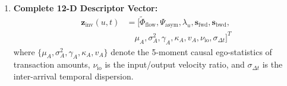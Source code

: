\begin{enumerate}
\begin{align}
    \end{align}
    computed exclusively over causal historical subgraphs ($t_e \le t$). Seed indicator $\mathbf{s}_{\text{seed}}(u, t) = 1.0$ strictly if $u \in \mathcal{V}_{\text{illicit}}^{\text{train}}$ and confirmation timestamp $t_{\text{conf}}(u) \le t - \Delta T_{\text{delay}}$, and $0.0$ otherwise, where $\Delta T_{\text{delay}} \in [30, 90]$\,days models investigative delay. Truncated Power Iteration ($T_{\text{iter}}=3$, tolerance $\epsilon=10^{-4}$) over degree-capped graph $\mathcal{G}_t^{(K)}$ ($K \le 15$) ensures deterministic $O(K \cdot T_{\text{iter}})$ computation with $<0.08$\,ms overhead. All validation, calibration, and test nodes receive $\mathbf{s}_{\text{seed}}(u) \equiv 0.0$, strictly precluding label leakage.
    \item \textbf{Complete 12-D Descriptor Vector:}
    \begin{align}
    \mathbf{z}_{\text{inv}}(u, t) &= \big[ \tilde{\Phi}_{\text{flow}}, \Psi_{\text{asym}}, \lambda_u, \mathbf{s}_{\text{fwd}}, \mathbf{s}_{\text{bwd}}, \nonumber \\
    &\quad \mu_A, \sigma_A^2, \gamma_A, \kappa_A, v_A, \nu_{\text{io}}, \sigma_{\Delta t} \big]^T
    \end{align}
    where $\{\mu_A, \sigma_A^2, \gamma_A, \kappa_A, v_A\}$ denote the 5-moment causal ego-statistics of transaction amounts, $\nu_{\text{io}}$ is the input/output velocity ratio, and $\sigma_{\Delta t}$ is the inter-arrival temporal dispersion.
\end{enumerate}

